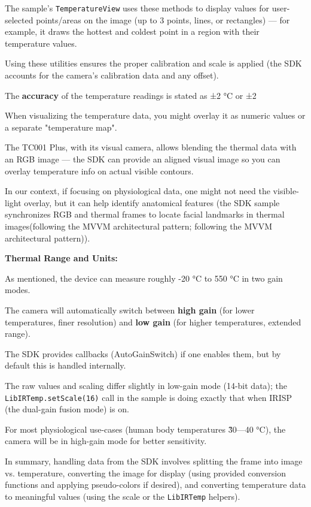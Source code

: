 {The sample's \texttt{TemperatureView} uses these methods to display values for user-selected points/areas on the image (up to 3 points, lines, or rectangles) --- for example, it draws the hottest and coldest point in a region with their temperature values.

Using these utilities ensures the proper calibration and scale is applied (the SDK accounts for the camera's calibration data and any offset).

The \textbf{accuracy}
 of the temperature readings is stated as ±2 °C or ±2%

When visualizing the temperature data, you might overlay it as numeric values or a separate "temperature map".

The TC001 Plus, with its visual camera, allows blending the thermal data with an RGB image --- the SDK can provide an aligned visual image so you can overlay temperature info on actual visible contours.

In our context, if focusing on physiological data, one might not need the visible-light overlay, but it can help identify anatomical features (the SDK sample synchronizes RGB and thermal frames to locate facial landmarks in thermal images(following the MVVM architectural pattern; following the MVVM architectural pattern)).

\textbf{Thermal Range and Units:}

As mentioned, the device can measure roughly -20 °C to 550 °C in two gain modes.

The camera will automatically switch between \textbf{high gain}
 (for lower temperatures, finer resolution) and \textbf{low gain}
 (for higher temperatures, extended range).

The SDK provides callbacks (AutoGainSwitch) if one enables them, but by default this is handled internally.

The raw values and scaling differ slightly in low-gain mode (14-bit data); the \texttt{LibIRTemp.setScale(16)} call in the sample is doing exactly that when IRISP (the dual-gain fusion mode) is on.

For most physiological use-cases (human body temperatures \~30---40 °C), the camera will be in high-gain mode for better sensitivity.

In summary, handling data from the SDK involves splitting the frame into image vs. temperature, converting the image for display (using provided conversion functions and applying pseudo-colors if desired), and converting temperature data to meaningful values (using the scale or the \texttt{LibIRTemp} helpers).

}

